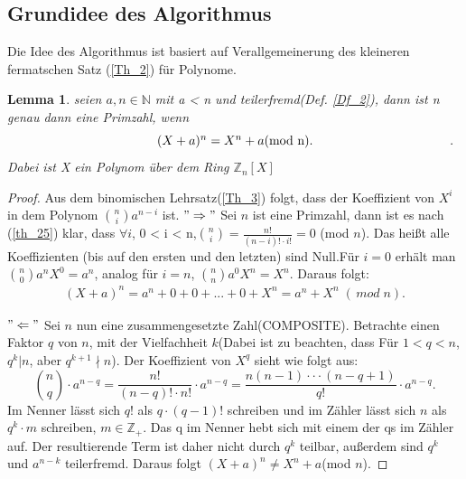 \documentclass[12pt,oneside]{article}
\newtheorem{lemma}[theorem]{Lemma}
\theoremstyle{remark}
\theoremstyle{definition}
\begin{document}
\subsection{Grundidee des Algorithmus}
Die Idee des Algorithmus ist basiert auf  Verallgemeinerung des kleineren fermatschen Satz (\ref{Th_2}) für Polynome.
\begin{flushleft}
\begin{lemma}\label{hauptlemma}
seien $a,n \in \mathbb{N}$ mit a < n und teilerfremd(Def. \ref{Df_2}), dann ist n genau dann eine Primzahl, wenn \newline
\begin{equation}\label{eq:1}
\centerline{ $(X + a)^n = X^n +a $(mod n).}.
\end{equation}\newline
Dabei ist X ein Polynom über dem Ring $\mathbb{Z}_{n}[X]$
\end{lemma}
\begin{proof}
Aus dem binomischen Lehrsatz(\ref{Th_3}) folgt, dass der Koeffizient von $X^i$ in dem Polynom ${n \choose i} a^{n-i}$ ist.\newline\newline
$"\Rightarrow"$\newline
Sei $n$ ist eine Primzahl, dann ist es nach (\ref{th_25}) klar, dass $\forall i $, 0 < i < n,\newline\smallskip ${n \choose i} = \frac{n!}{(n-i)! \cdot i!} = 0 $ (mod $n$). Das heißt alle Koeffizienten (bis auf den ersten und den letzten) sind Null.\newline\newline Für $i = 0$ erhält man  ${n \choose 0} a^n X^0 = a^n$, analog für $i = n$, ${n \choose n} a^0 X^n = X^n$. Daraus folgt:
\begin{align*}
    (X + a)^n = a^n + 0 + 0 + ... + 0 + X^n = a^n + X^n \; ( \, mod \; n).
\end{align*}

$"\Leftarrow"$\newline
Sei $n$ nun eine zusammengesetzte Zahl(COMPOSITE). Betrachte einen Faktor $q$ von $n$, mit der Vielfachheit $k$(Dabei ist zu beachten, dass Für $1 < q < n$, $q^k | n$, aber $q^{k+1} \nmid n$).\newline
Der Koeffizient von $X^q$ sieht wie folgt aus:\newline\smallskip
\begin{equation}
    {n \choose q} \cdot a^{n-q} = \frac{n!}{(n-q)! \cdot n!} \cdot a^{n-q} = \frac{n(n-1)\cdot \cdot \cdot (n-q+1)}{q!} \cdot a^{n-q}.
\end{equation}
\newline\newline
Im Nenner lässt sich $q!$ als $q \cdot (q-1)!$ schreiben und im Zähler lässt sich $n$ als $q^k\cdot m$ schreiben, $m \in \mathbb{Z}_{+}$. Das q im Nenner hebt sich mit einem der qs im Zähler auf. Der resultierende Term ist daher nicht durch $q^k$ teilbar, außerdem sind $q^k$ und $a^{n-k}$ teilerfremd. Daraus folgt $(X + a)^n \neq X^n + a $(mod $n$).
\end{proof}


\end{flushleft}
\end{document}
